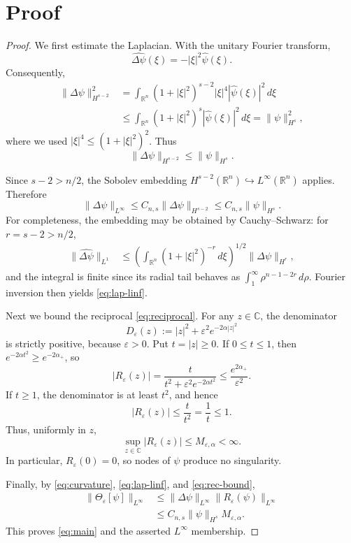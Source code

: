 \documentclass[11pt]{article}
\newcommand{\R}{\mathbb{R}}
\newcommand{\C}{\mathbb{C}}
\newcommand{\eps}{\varepsilon}
\begin{document}
\section{Proof}
\begin{proof}
We first estimate the Laplacian. With the unitary Fourier transform,
\[
 \widehat{\Delta\psi}(\xi)=-|\xi|^2\widehat\psi(\xi).
\]
Consequently,
\begin{align}
 \|\Delta\psi\|_{H^{s-2}}^2
 &=\int_{\R^n}(1+|\xi|^2)^{s-2}|\xi|^4
             |\widehat\psi(\xi)|^2\,d\xi\\
 &\le\int_{\R^n}(1+|\xi|^2)^s
             |\widehat\psi(\xi)|^2\,d\xi
  =\|\psi\|_{H^s}^2,
\end{align}
where we used $|\xi|^4\le(1+|\xi|^2)^2$. Thus
\begin{equation}\label{eq:lap-hs}
 \|\Delta\psi\|_{H^{s-2}}\le\|\psi\|_{H^s}.
\end{equation}

Since $s-2>n/2$, the Sobolev embedding
$H^{s-2}(\R^n)\hookrightarrow L^\infty(\R^n)$ applies. Therefore
\begin{equation}\label{eq:lap-linf}
 \|\Delta\psi\|_{L^\infty}
 \le C_{n,s}\|\Delta\psi\|_{H^{s-2}}
 \le C_{n,s}\|\psi\|_{H^s}.
\end{equation}
For completeness, the embedding may be obtained by Cauchy--Schwarz:
for $r=s-2>n/2$,
\begin{align}
 \|\widehat{\Delta\psi}\|_{L^1}
 &\le\left(\int_{\R^n}(1+|\xi|^2)^{-r}\,d\xi\right)^{1/2}
       \|\Delta\psi\|_{H^r},
\end{align}
and the integral is finite since its radial tail behaves as
$\int_1^\infty\rho^{n-1-2r}\,d\rho$. Fourier inversion then yields
\eqref{eq:lap-linf}.

Next we bound the reciprocal \eqref{eq:reciprocal}. For any $z\in\C$, the
denominator
\[
 D_\eps(z):=|z|^2+\eps^2e^{-2\alpha|z|^2}
\]
is strictly positive, because $\eps>0$. Put $t=|z|\ge0$.
If $0\le t\le1$, then $e^{-2\alpha t^2}\ge e^{-2\alpha_+}$, so
\[
 |R_\eps(z)|
 =\frac{t}{t^2+\eps^2e^{-2\alpha t^2}}
 \le\frac{e^{2\alpha_+}}{\eps^2}.
\]
If $t\ge1$, the denominator is at least $t^2$, and hence
\[
 |R_\eps(z)|\le\frac{t}{t^2}=\frac1t\le1.
\]
Thus, uniformly in $z$,
\begin{equation}\label{eq:rec-bound}
 \sup_{z\in\C}|R_\eps(z)|\le M_{\eps,\alpha}<\infty.
\end{equation}
In particular, $R_\eps(0)=0$, so nodes of $\psi$ produce no
singularity.

Finally, by \eqref{eq:curvature}, \eqref{eq:lap-linf}, and
\eqref{eq:rec-bound},
\begin{align*}
 \|\Theta_\eps[\psi]\|_{L^\infty}
 &\le\|\Delta\psi\|_{L^\infty}
       \|R_\eps(\psi)\|_{L^\infty}\\
 &\le C_{n,s}\|\psi\|_{H^s} M_{\eps,\alpha}.
\end{align*}
This proves \eqref{eq:main} and the asserted $L^\infty$ membership.
\end{proof}
\end{document}
